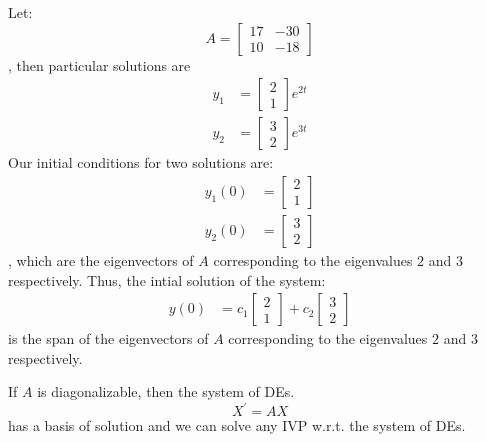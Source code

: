 \documentclass[11pt]{report}
\begin{document}
\begin{example}
    Let:
    $$
    A = \begin{bmatrix}
        17 & -30 \\
        10 & -18 
    \end{bmatrix}
    $$
    , then particular solutions are
    \begin{align*}
        y_1 &= \begin{bmatrix}
            2 \\ 1
        \end{bmatrix}e^{2 t} \\
        y_2 &= \begin{bmatrix}
            3 \\ 2
        \end{bmatrix}e^{3 t}
    \end{align*}
    Our initial conditions for two solutions are:
    \begin{align*}
        y_1(0) &= \begin{bmatrix}
            2 \\ 1
        \end{bmatrix} \\
        y_2(0) &= \begin{bmatrix}
            3 \\ 2
        \end{bmatrix}
    \end{align*}
    , which are the eigenvectors of $A$ corresponding to the eigenvalues $2$ and $3$ respectively. Thus, the intial solution of the system:
    \begin{align*}
        y(0) &= c_1\begin{bmatrix}
            2 \\ 1
        \end{bmatrix} + c_2\begin{bmatrix}
            3 \\ 2
        \end{bmatrix} 
    \end{align*}
    is the span of the eigenvectors of $A$ corresponding to the eigenvalues $2$ and $3$ respectively.
\end{example}
\begin{theorem}
    If $A$ is diagonalizable, then the system of DEs.
    \begin{equation}
        X^\prime = AX
    \end{equation}
    has a basis of solution and we can solve any IVP w.r.t. the system of DEs.
\end{theorem}
\subs
\end{document}
